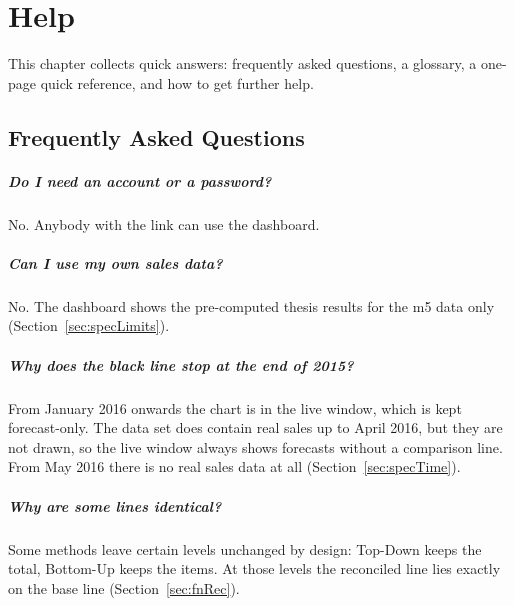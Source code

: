 %
%
%


\chapter{Help}
\label{chap:help}

This chapter collects quick answers: frequently asked questions, a glossary, a one-page quick reference, and how to get further help.

\section{Frequently Asked Questions}
\label{sec:helpFAQ}

\paragraph{Do I need an account or a password?}
No. Anybody with the link can use the dashboard.

\paragraph{Can I use my own sales data?}
No. The dashboard shows the pre-computed thesis results for the \ac{m5} data only (Section~\ref{sec:specLimits}).

\paragraph{Why does the black line stop at the end of 2015?}
From January 2016 onwards the chart is in the live window, which is kept forecast-only. The data set does contain real sales up to April 2016, but they are not drawn, so the live window always shows forecasts without a comparison line. From May 2016 there is no real sales data at all (Section~\ref{sec:specTime}).

\paragraph{Why are some lines identical?}
Some methods leave certain levels unchanged by design: Top-Down keeps the total, Bottom-Up keeps the items. At those levels the reconciled line lies exactly on the base line (Section~\ref{sec:fnRec}).

